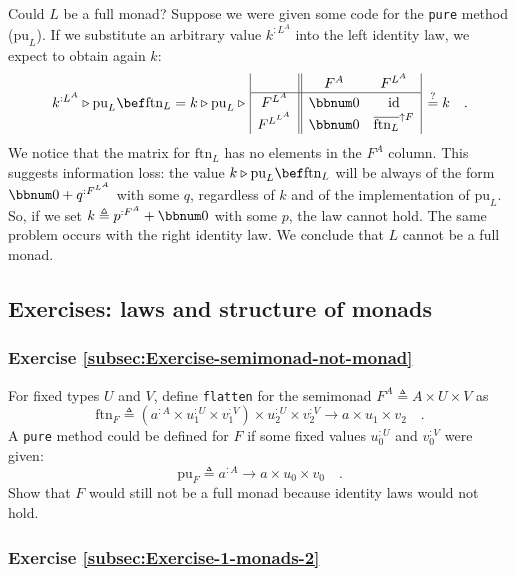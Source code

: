 Could $L$ be a full monad? Suppose we were given some code for the
\lstinline!pure! method ($\text{pu}_{L}$). If we substitute an arbitrary
value $k^{:L^{A}}$ into the left identity law, we expect to obtain
again $k$:
\[
k^{:L^{A}}\triangleright\text{pu}_{L}\bef\text{ftn}_{L}=k\triangleright\text{pu}_{L}\triangleright\,\begin{array}{|c||cc|}
 & F^{A} & F^{L^{A}}\\
\hline F^{L^{A}} & \bbnum 0 & \text{id}\\
F^{L^{L^{A}}} & \bbnum 0 & \overline{\text{ftn}_{L}}^{\uparrow F}
\end{array}\,\overset{?}{=}k\quad.
\]
We notice that the matrix for $\text{ftn}_{L}$ has no elements in
the $F^{A}$ column. This suggests information loss: the value $k\triangleright\text{pu}_{L}\bef\text{ftn}_{L}$
will be always of the form $\bbnum 0+q^{:F^{L^{A}}}$ with some $q$,
regardless of $k$ and of the implementation of $\text{pu}_{L}$.
So, if we set $k\triangleq p^{:F^{A}}+\bbnum 0$ with some $p$, the
law cannot  hold. The same problem occurs with the right identity
law. We conclude that $L$ cannot be a full monad.

\subsection{Exercises: laws and structure of monads}

\subsubsection{Exercise \label{subsec:Exercise-semimonad-not-monad}\ref{subsec:Exercise-semimonad-not-monad}}

For fixed types $U$ and $V$, define \lstinline!flatten! for the
semimonad $F^{A}\triangleq A\times U\times V$ as
\[
\text{ftn}_{F}\triangleq(a^{:A}\times u_{1}^{:U}\times v_{1}^{:V})\times u_{2}^{:U}\times v_{2}^{:V}\rightarrow a\times u_{1}\times v_{2}\quad.
\]
A \lstinline!pure! method could be defined for $F$ if some fixed
values $u_{0}^{:U}$ and $v_{0}^{:V}$ were given:
\[
\text{pu}_{F}\triangleq a^{:A}\rightarrow a\times u_{0}\times v_{0}\quad.
\]
Show that $F$ would still not be a full monad because identity laws
would not hold.

\subsubsection{Exercise \label{subsec:Exercise-1-monads-2}\ref{subsec:Exercise-1-monads-2}}

